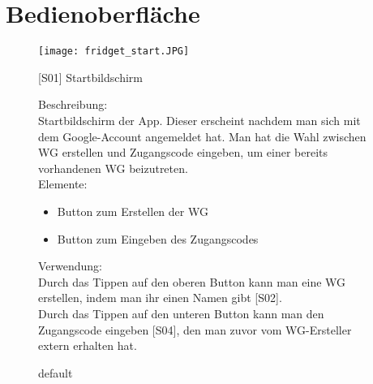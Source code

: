 \documentclass[a4paper]{scrreprt}
\begin{document}
        	\newpage
        \section{Bedienoberfläche}
        
        \begin{figure}[h]
        	\begin{minipage}[b]{0.4\linewidth}
        		
        		\flushright
        		\centering
        		\texttt{[image: fridget\_start.JPG]}
        		\caption{default}
        		\label{fig:figure1}
        	\end{minipage}
        	\hspace{0.5cm}
        	\begin{minipage}[b]{0.55\linewidth}
        		\flushleft
        		{[}S01{]} Startbildschirm 
        		
        		Beschreibung: \\
        		Startbildschirm der App. Dieser erscheint nachdem man sich mit dem Google-Account angemeldet hat. Man hat die Wahl zwischen WG erstellen und Zugangscode eingeben, um einer bereits vorhandenen WG beizutreten.
        		\\
        		Elemente:
        		\begin{itemize}
        		\renewcommand\labelitemi{--}
        		\item Button zum Erstellen der WG
        		\item Button zum Eingeben des Zugangscodes
        		\end{itemize}
        		
        		Verwendung:\\
        		Durch das Tippen auf den oberen Button
        		kann man eine WG erstellen, indem man ihr
        		einen Namen gibt {[}S02{]}.\\
        		Durch das Tippen auf den unteren Button kann
        		man den Zugangscode eingeben {[}S04{]}, den man zuvor vom WG-Ersteller extern erhalten 
        		hat.
        		
        	\end{minipage}
        \end{figure}
    
\end{document}
